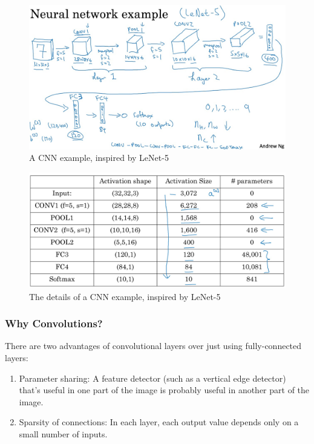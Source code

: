 \documentclass[UTF8]{article}
\begin{document}
\begin{figure}[htb]
    \centering
    \includegraphics[width=40em]{figures/cnn-example}
    \caption{A CNN example, inspired by LeNet-5}
    \label{fig:cnn-example}
\end{figure}

\begin{figure}[htb]
    \centering
    \includegraphics[width=40em]{figures/cnn-example-details}
    \caption{The details of a CNN example, inspired by LeNet-5}
    \label{fig:cnn-example-details}
\end{figure}

\subsubsection{Why Convolutions?}
There are two advantages of convolutional layers over just using fully-connected layers:
\begin{enumerate}
    \item Parameter sharing: A feature detector (such as a vertical edge detector) that's useful in
    one part of the image is probably useful in another part of the image.
    \item Sparsity of connections: In each layer, each output value depends only on a small number
    of inputs.
\end{enumerate}
\end{document}
